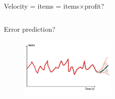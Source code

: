 \documentclass[10pt]{beamer}
\begin{document}
\begin{frame}{Velocity = items = items$\times$profit?}
\begin{columns}
\begin{column}{0.65\textwidth}
\begin{figure}
\end{figure}
\begin{center}
Error prediction?
\end{center}
\begin{figure}
\centering
     \includegraphics[height=30mm]{img_2/6.png}
\end{figure}
\end{column}
\end{columns}
\end{frame}
\end{document}
